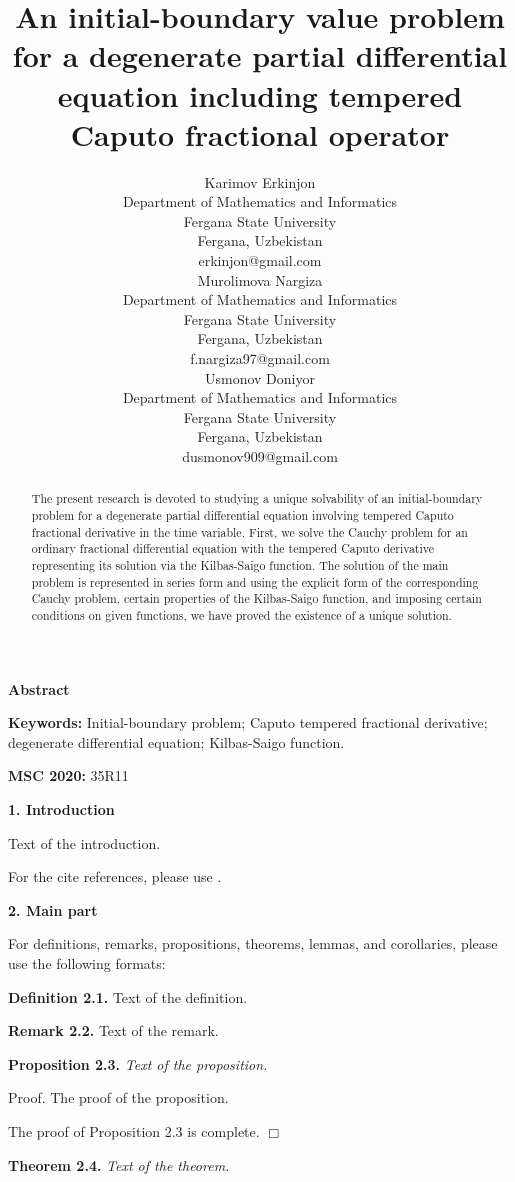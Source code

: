 \documentclass{article}
\title{An initial-boundary value problem for a degenerate partial differential equation including tempered Caputo fractional operator}
\author{
 Karimov Erkinjon \\
  Department of Mathematics and Informatics\\
Fergana State University\\
Fergana, Uzbekistan\\
erkinjon@gmail.com\\
   \And
 Murolimova Nargiza\\
  Department of Mathematics and Informatics\\
Fergana State University\\
Fergana, Uzbekistan\\
f.nargiza97@gmail.com\\
  \And
Usmonov Doniyor\\
  Department of Mathematics and Informatics\\
Fergana State University\\
Fergana, Uzbekistan\\
dusmonov909@gmail.com\\
}
\begin{document}
\maketitle
\begin{center}
{\large \sc \bf Abstract}
\end{center}
\begin{abstract}
{ The present research is devoted to studying a unique solvability of an initial-boundary problem for a degenerate partial differential equation involving tempered Caputo fractional derivative in the time variable. First, we solve the Cauchy problem for an ordinary fractional differential equation with the tempered Caputo derivative representing its solution via the Kilbas-Saigo function. The solution of the main problem is represented in series form and using the explicit form of the corresponding Cauchy problem, certain properties of the Kilbas-Saigo function, and imposing certain conditions on given functions, we have proved the existence of a unique solution.} 

\end{abstract}
\label{firstpage}

{\bf Keywords:} %
{Initial-boundary problem; Caputo tempered fractional derivative; degenerate differential equation; Kilbas-Saigo function.}

{\bf MSC 2020:} 35R11



{\bf \large 1. Introduction}

Text of the introduction.

For the cite references, please use \cite{Author3}.


{\bf \large 2. Main part}

For definitions, remarks, propositions, theorems, lemmas, and corollaries, please use the following formats:  

\textbf{Definition 2.1.} 
\rm{Text of the definition.}

\textbf{Remark 2.2.} 
\rm{Text of the remark.}

\textbf{Proposition 2.3.} 
\emph{Text of the proposition.}

\medskip
{\sf Proof. } The proof of the proposition. 

The proof of Proposition 2.3 is complete.  
\hfill $\Box$


\textbf{Theorem 2.4.} 
\emph{Text of the theorem.}
\end{document}
